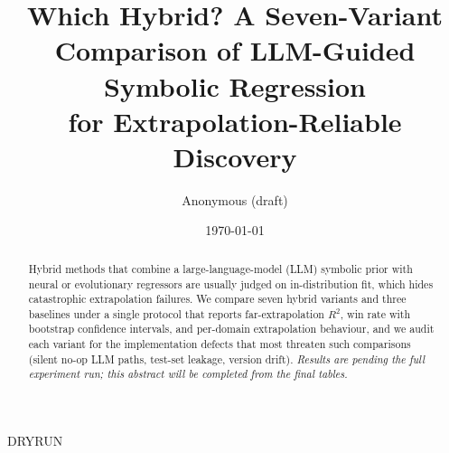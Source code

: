 \documentclass[11pt]{article}
\title{Which Hybrid? A Seven-Variant Comparison of LLM-Guided Symbolic Regression\\for Extrapolation-Reliable Discovery}
\author{Anonymous (draft)}
\date{\today}
\newcommand{\dryrunTag}{DRYRUN}
\begin{document}
\maketitle
\ifx\datastatus\dryrunTag\begin{center}\end{center}\fi
\begin{abstract}
Hybrid methods that combine a large-language-model (LLM) symbolic prior with neural or evolutionary regressors are usually judged on in-distribution fit, which hides catastrophic extrapolation failures. We compare seven hybrid variants and three baselines under a single protocol that reports far-extrapolation $R^2$, win rate with bootstrap confidence intervals, and per-domain extrapolation behaviour, and we audit each variant for the implementation defects that most threaten such comparisons (silent no-op LLM paths, test-set leakage, version drift). \emph{Results are pending the full experiment run; this abstract will be completed from the final tables.}
\end{abstract}



\appendix
\end{document}
